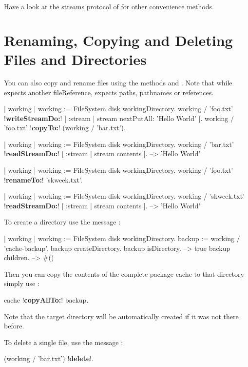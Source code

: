 \documentclass[a4paper,10pt,twoside]{book}
\begin{document}
Have a look at the streams protocol of  for other convenience methods.

\section{Renaming, Copying and Deleting Files and Directories}

You can also copy and rename files using the methods  and . Note that while  expects another fileReference,   expects paths, pathnames or references.

\begin{code}{}
| working |
working := FileSystem disk workingDirectory.
working / 'foo.txt' !\textbf{writeStreamDo:}! [ :stream | stream nextPutAll: 'Hello World' ].
working / 'foo.txt' !\textbf{copyTo:}! (working / 'bar.txt').

| working  |
working := FileSystem disk workingDirectory.
working / 'bar.txt' !\textbf{readStreamDo:}! [ :stream | stream contents ].
-->  'Hello World'

| working |
working := FileSystem disk workingDirectory.
working / 'foo.txt' !\textbf{renameTo:}! 'skweek.txt'.

| working  |
working := FileSystem disk workingDirectory.
working / 'skweek.txt' !\textbf{readStreamDo:}! [ :stream | stream contents ]. 
-->  'Hello World'
\end{code} 



To create a directory use the message :

\begin{code}{}
| working  |
working := FileSystem disk workingDirectory.
backup := working / 'cache-backup'.
backup createDirectory.
backup isDirectory.
	--> true
backup children.
	--> #()
\end{code} 

Then you can  copy the contents of the complete package-cache to that directory simply use :

\begin{code}{}
cache !\textbf{copyAllTo:}! backup.
\end{code}

Note that the target directory will be automatically created if it was not there before.


To delete a single file, use the message :
\begin{code}{}
 (working / 'bar.txt') !\textbf{delete}!.
\end{code}
\end{document}
